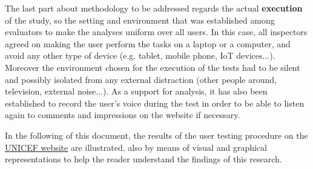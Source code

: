 The last part about methodology to be addressed regards the actual \textbf{execution} of the study, so the setting and environment that was established among evaluators to make the analyses uniform over all users.
In this case, all inspectors agreed on making the user perform the tasks on a laptop or a computer, and avoid any other type of device (e.g. tablet, mobile phone, IoT devices...). Moreover the environment chosen for the execution of the tests had to be silent and possibly isolated from any external distraction (other people around, television, external noise...).
As a support for analysis, it has also been established to record the user's voice during the test in order to be able to listen again to comments and impressions on the website if necessary.

In the following of this document, the results of the user testing procedure on the \href{https://www.unicef.org/}{UNICEF website} are illustrated, also by means of visual and graphical representations to help the reader understand the findings of this research.
	

